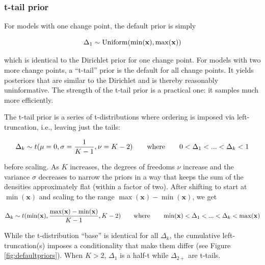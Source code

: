 \documentclass[
  american,
]{article}
\begin{document}
\hypertarget{t-tail}{%
\subsubsection{t-tail prior}\label{t-tail}}

For models with one change point, the default prior is simply

\begin{equation}
\Delta_1 \sim {\rm Uniform}(\min(\mathbf{x}), \max(\mathbf{x}))
\end{equation}

which is identical to the Dirichlet prior for one change point. For models with two more change points, a ``t-tail'' prior is the default for all change points. It yields posteriors that are similar to the Dirichlet and is thereby reasonably uninformative. The strength of the t-tail prior is a practical one: it samples much more efficiently.

The t-tail prior is a series of t-distributions where ordering is imposed via left-truncation, i.e., leaving just the tails:

\begin{equation}
\Delta_k \sim t(\mu = 0, \sigma = \frac{1}{K - 1}, \nu = K-2) \hspace{2em} {\rm where} \hspace{2em} 0 < \Delta_1 < ... < \Delta_k < 1
\end{equation}

before scaling. As \(K\) increases, the degrees of freedoms \(\nu\) increase and the variance \(\sigma\) decreases to narrow the priors in a way that keeps the sum of the densities approximately flat (within a factor of two). After shifting to start at \(\min(\mathbf{x})\) and scaling to the range \(\max(\mathbf{x}) - \min(\mathbf{x})\), we get

\begin{equation}
\Delta_k \sim t(\min(\mathbf{x}), \frac{\max(\mathbf{x}) - \min(\mathbf{x})}{K-1}, K-2) \hspace{2em} {\rm where} \hspace{2em} \min(\mathbf{x}) < \Delta_1 < ... < \Delta_k < \max(\mathbf{x})
\end{equation}

While the t-distribution ``base'' is identical for all \(\Delta_k\), the cumulative left-truncation(s) imposes a conditionality that make them differ (see Figure \ref{fig:defaultpriors}). When \(K > 2\), \(\Delta_1\) is a half-t while \(\Delta_{2+}\) are t-tails.
\end{document}
